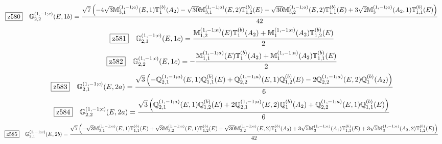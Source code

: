 \documentclass[fleqn,10pt,landscape]{jsarticle}
\begin{document}
\begin{dmath*}
\hspace*{3mm}\fbox{z580}\quad \mathbb{G}_{2,2}^{(1,-1;c)}(E,1b)=\frac{\sqrt{7} \left(- 4 \sqrt{3} \mathbb{M}_{3,1}^{(1,-1;a)}(E,1) \mathbb{T}_{1}^{(b)}(A_{2}) - \sqrt{30} \mathbb{M}_{3,1}^{(1,-1;a)}(E,2) \mathbb{T}_{1,2}^{(b)}(E) - \sqrt{30} \mathbb{M}_{3,2}^{(1,-1;a)}(E,2) \mathbb{T}_{1,1}^{(b)}(E) + 3 \sqrt{2} \mathbb{M}_{3}^{(1,-1;a)}(A_{2},1) \mathbb{T}_{1,1}^{(b)}(E)\right)}{42}
\end{dmath*}
\begin{dmath*}
\hspace*{3mm}\fbox{z581}\quad \mathbb{G}_{2,1}^{(1,-1;c)}(E,1c)=\frac{\mathbb{M}_{1,2}^{(1,-1;a)}(E) \mathbb{T}_{1}^{(b)}(A_{2}) + \mathbb{M}_{1}^{(1,-1;a)}(A_{2}) \mathbb{T}_{1,2}^{(b)}(E)}{2}
\end{dmath*}
\begin{dmath*}
\hspace*{3mm}\fbox{z582}\quad \mathbb{G}_{2,2}^{(1,-1;c)}(E,1c)=- \frac{\mathbb{M}_{1,1}^{(1,-1;a)}(E) \mathbb{T}_{1}^{(b)}(A_{2}) + \mathbb{M}_{1}^{(1,-1;a)}(A_{2}) \mathbb{T}_{1,1}^{(b)}(E)}{2}
\end{dmath*}
\begin{dmath*}
\hspace*{3mm}\fbox{z583}\quad \mathbb{G}_{2,1}^{(1,-1;c)}(E,2a)=\frac{\sqrt{3} \left(- \mathbb{Q}_{2,1}^{(1,-1;a)}(E,1) \mathbb{Q}_{1,1}^{(b)}(E) + \mathbb{Q}_{2,2}^{(1,-1;a)}(E,1) \mathbb{Q}_{1,2}^{(b)}(E) - 2 \mathbb{Q}_{2,2}^{(1,-1;a)}(E,2) \mathbb{Q}_{1}^{(b)}(A_{2})\right)}{6}
\end{dmath*}
\begin{dmath*}
\hspace*{3mm}\fbox{z584}\quad \mathbb{G}_{2,2}^{(1,-1;c)}(E,2a)=\frac{\sqrt{3} \left(\mathbb{Q}_{2,1}^{(1,-1;a)}(E,1) \mathbb{Q}_{1,2}^{(b)}(E) + 2 \mathbb{Q}_{2,1}^{(1,-1;a)}(E,2) \mathbb{Q}_{1}^{(b)}(A_{2}) + \mathbb{Q}_{2,2}^{(1,-1;a)}(E,1) \mathbb{Q}_{1,1}^{(b)}(E)\right)}{6}
\end{dmath*}
\begin{dmath*}
\hspace*{3mm}\fbox{z585}\quad \mathbb{G}_{2,1}^{(1,-1;c)}(E,2b)=\frac{\sqrt{7} \left(- \sqrt{3} \mathbb{M}_{3,1}^{(1,-1;a)}(E,1) \mathbb{T}_{1,1}^{(b)}(E) + \sqrt{3} \mathbb{M}_{3,2}^{(1,-1;a)}(E,1) \mathbb{T}_{1,2}^{(b)}(E) + \sqrt{30} \mathbb{M}_{3,2}^{(1,-1;a)}(E,2) \mathbb{T}_{1}^{(b)}(A_{2}) + 3 \sqrt{5} \mathbb{M}_{3}^{(1,-1;a)}(A_{1}) \mathbb{T}_{1,1}^{(b)}(E) + 3 \sqrt{5} \mathbb{M}_{3}^{(1,-1;a)}(A_{2},2) \mathbb{T}_{1,2}^{(b)}(E)\right)}{42}
\end{dmath*}
\end{document}

